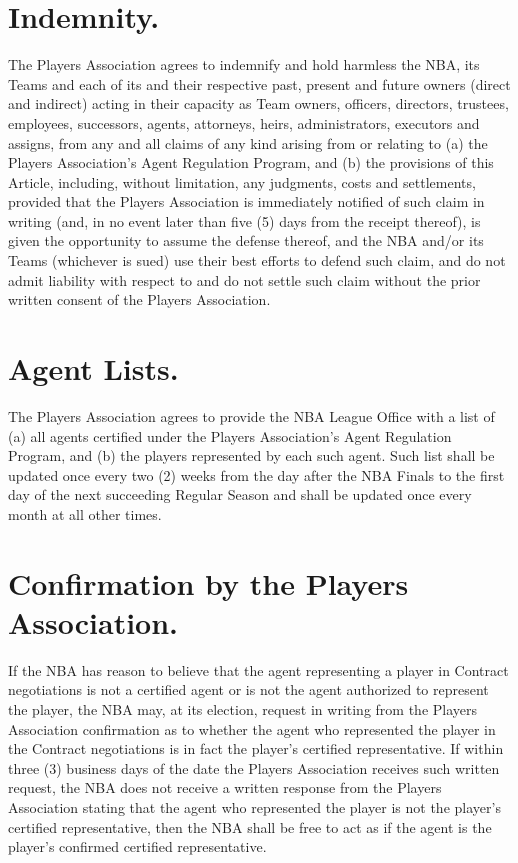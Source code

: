\documentclass[
]{book}
\begin{document}
\hypertarget{indemnity.}{%
\section{Indemnity.}\label{indemnity.}}

The Players Association agrees to indemnify and hold harmless the NBA, its Teams and each of its and their respective past, present and future owners (direct and indirect) acting in their capacity as Team owners, officers, directors, trustees, employees, successors, agents, attorneys, heirs, administrators, executors and assigns, from any and all claims of any kind arising from or relating to (a) the Players Association's Agent Regulation Program, and (b) the provisions of this Article, including, without limitation, any judgments, costs and settlements, provided that the Players Association is immediately notified of such claim in writing (and, in no event later than five (5) days from the receipt thereof), is given the opportunity to assume the defense thereof, and the NBA and/or its Teams (whichever is sued) use their best efforts to defend such claim, and do not admit liability with respect to and do not settle such claim without the prior written consent of the Players Association.

\hypertarget{agent-lists.}{%
\section{Agent Lists.}\label{agent-lists.}}

The Players Association agrees to provide the NBA League Office with a list of (a) all agents certified under the Players Association's Agent Regulation Program, and (b) the players represented by each such agent. Such list shall be updated once every two (2) weeks from the day after the NBA Finals to the first day of the next succeeding Regular Season and shall be updated once every month at all other times.

\hypertarget{confirmation-by-the-players-association.}{%
\section{Confirmation by the Players Association.}\label{confirmation-by-the-players-association.}}

If the NBA has reason to believe that the agent representing a player in Contract negotiations is not a certified agent or is not the agent authorized to represent the player, the NBA may, at its election, request in writing from the Players Association confirmation as to whether the agent who represented the player in the Contract negotiations is in fact the player's certified representative. If within three (3) business days of the date the Players Association receives such written request, the NBA does not receive a written response from the Players Association stating that the agent who represented the player is not the player's certified representative, then the NBA shall be free to act as if the agent is the player's confirmed certified representative.
\end{document}
